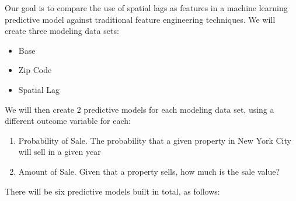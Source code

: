 \documentclass[12pt,]{article}
\providecommand{\tightlist}{%
  \setlength{\itemsep}{0pt}\setlength{\parskip}{0pt}}
\begin{document}
Our goal is to compare the use of spatial lags as features in a machine
learning predictive model against traditional feature engineering
techniques. We will create three modeling data sets:

\begin{itemize}
\tightlist
\item
  Base
\item
  Zip Code
\item
  Spatial Lag
\end{itemize}

We will then create 2 predictive models for each modeling data set,
using a different outcome variable for each:

\begin{enumerate}
\def\labelenumi{\arabic{enumi})}
\tightlist
\item
  Probability of Sale. The probability that a given property in New York
  City will sell in a given year
\item
  Amount of Sale. Given that a property sells, how much is the sale
  value?
\end{enumerate}

There will be six predictive models built in total, as follows:

\begin{table}

\caption{\label{tab:model table}Six Predictive Models}
\centering
{}
\end{table}
\end{document}
